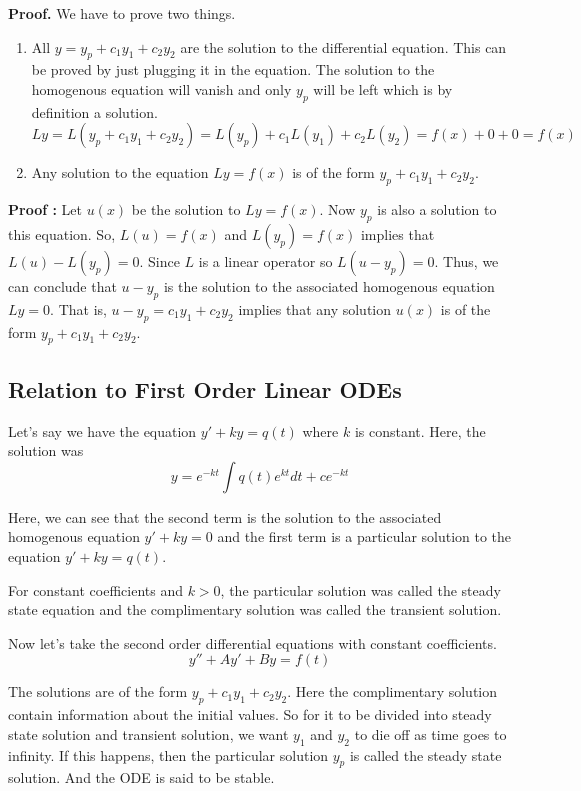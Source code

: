 {\bf Proof. }
We have to prove two things.

\begin{enumerate}
    \item All $y = y_p + c_1 y_1 + c_2 y_2$ are the solution to the differential equation.
    This can be proved by just plugging it in the equation. 
    The solution to the homogenous equation will vanish and only $y_p$ will be left which is by definition a solution.
    $$ Ly = L(y_p + c_1 y_1 + c_2 y_2) = L(y_p) + c_1 L(y_1) + c_2 L(y_2) = f(x) + 0 + 0 = f(x)$$ 
    \item Any solution to the equation $Ly = f(x)$ is of the form $y_p + c_1 y_1 + c_2 y_2$.
\end{enumerate}

{\bf Proof : } Let $u(x)$ be the solution to $Ly = f(x)$.
Now $y_p$ is also a solution to this equation. 
So, $L(u) = f(x)$ and  $L(y_p) = f(x)$ implies that $L(u) - L(y_p) = 0$.
Since $L$ is a linear operator so $L(u - y_p) = 0$.
Thus, we can conclude that $u - y_p$ is the solution to the associated homogenous equation $Ly = 0$.
That is, $u - y_p = c_1 y_1 + c_2 y_2$ implies that any solution $u(x)$  is of the form $y_p + c_1 y_1 + c_2 y_2$.


\subsection{Relation to First Order Linear ODEs}

Let's say we have the equation $y' + ky = q(t)$ where $k$ is constant.
Here, the solution was
$$ y = e^{-kt} \int q(t) e^{kt} dt + ce^{-kt} $$

Here, we can see that the second term is the solution to the associated homogenous equation $y' + ky = 0$
and the first term is a particular solution to the equation $y' + ky = q(t)$.

For constant coefficients and $k > 0$, the particular solution was called the steady state equation 
and the complimentary solution was called the transient solution.

Now let's take the second order differential equations with constant coefficients.
$$ y'' + Ay' + By = f(t) $$

The solutions are of the form $y_p + c_1 y_1 + c_2 y_2$.
Here the complimentary solution contain information about the initial values.
So for it to be divided into steady state solution and transient solution, 
we want $y_1$ and $y_2$ to die off as time goes to infinity.
If this happens, then the particular solution $y_p$ is called the steady state solution.
And the ODE is said to be stable.

